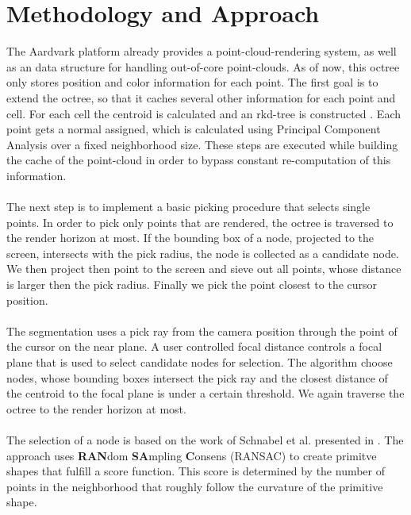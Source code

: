 \section{Methodology and Approach}

The Aardvark platform already provides a point-cloud-rendering system, as well as an data structure for handling out-of-core point-clouds. As of now, this octree only stores position and color information for each point. The first goal is to extend the octree, so that it caches several other information for each point and cell.  For each cell the centroid is calculated and an rkd-tree is constructed \cite{tobler2011rkd}. Each point gets a normal assigned, which is calculated using Principal Component Analysis \cite{jolliffe2002principal} over a fixed neighborhood size. These steps are executed while building the cache of the point-cloud in order to bypass constant re-computation of this information. 
\\
\\
The next step is to implement a basic picking procedure that selects single points. In order to pick only points that are rendered, the octree is traversed to the render horizon at most. If the bounding box of a node, projected to the screen, intersects with the pick radius, the node is collected as a candidate node. We then project then point to the screen and sieve out all points, whose distance is larger then the pick radius. Finally we pick the point closest to the cursor position. 
\\
\\
The segmentation uses a pick ray from the camera position through the point of the cursor on the near plane. A user controlled focal distance controls a focal plane that is used to select candidate nodes for selection. The algorithm choose nodes, whose bounding boxes intersect the pick ray and the closest distance of the centroid to the focal plane is under a certain threshold. We again traverse the octree to the render horizon at most.
\\
\\
The selection of a node is based on the work of Schnabel et al. presented in \cite{schnabel-2007-efficient}. The approach uses \textbf{RAN}dom \textbf{SA}mpling \textbf{C}onsens (RANSAC) \cite{fischler1981random} to create primitve shapes that fulfill a score function. This score is determined by the number of points in the neighborhood that roughly follow the curvature of the primitive shape.
\\
\\
